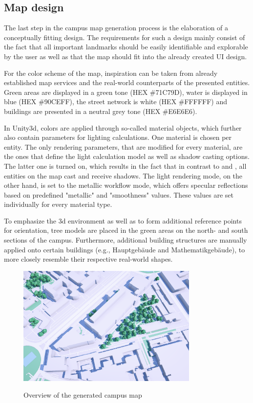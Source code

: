 \subsection{Map design}
The last step in the campus map generation process is the elaboration of a conceptually fitting design. The requirements for such a design mainly consist of the fact that all important landmarks should be easily identifiable and explorable by the user as well as that the map should fit into the already created UI design.

For the color scheme of the map, inspiration can be taken from already established map services \cite{google_maps_website} \cite{apple_maps_website} and the real-world counterparts of the presented entities. Green areas are displayed in a green tone (HEX \#71C79D), water is displayed in blue (HEX \#90CEFF), the street network is white (HEX \#FFFFFF) and buildings are presented in a neutral grey tone (HEX \#E6E6E6).

In Unity3d, colors are applied through so-called material objects, which further also contain parameters for lighting calculations. One material is chosen per entity. The only rendering parameters, that are modified for every material, are the ones that define the light calculation model as well as shadow casting options. The latter one is turned on, which results in the fact that in contrast to \cite{google_maps_website} and \cite{apple_maps_website}, all entities on the map cast and receive shadows. The light rendering mode, on the other hand, is set to the metallic workflow mode, which offers specular reflections based on predefined "metallic" and "smoothness" values. These values are set individually for every material type.

To emphasize the 3d environment as well as to form additional reference points for orientation, tree models are placed in the green areas on the north- and south sections of the campus. Furthermore, additional building structures are manually applied onto certain buildings (e.g., Hauptgebäude and Mathematikgebäude), to more closely resemble their respective real-world shapes.

\begin{figure}[H]
	\centering
	\includegraphics[width=0.8\textwidth]{images/generated_campus_map.png}\\
	\caption{Overview of the generated campus map}
\end{figure}

